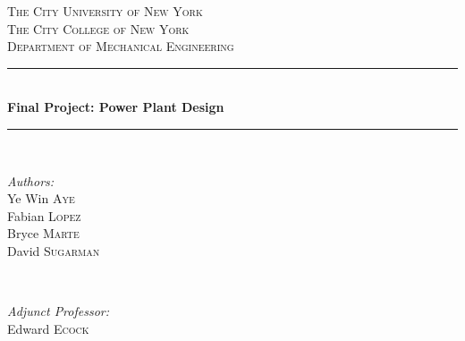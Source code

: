 \documentclass[12pt,letterpaper,notitlepage]{article}
\begin{document}
\begin{titlepage}

\newcommand{\HRule}{\rule{\linewidth}{0.5mm}} %

\center %


\textsc{\LARGE The City University of New York}\\[1.5cm] %
\textsc{\Large The City College of New York}\\[0.5cm] %
\textsc{\large Department of Mechanical Engineering}\\[0.5cm] %


\HRule \\[0.4cm]
{ \huge \bfseries Final Project: Power Plant Design}\\[0.4cm] %
\HRule \\[1.5cm]


\begin{minipage}{0.4\textwidth}
\begin{flushleft} \large
\emph{Authors:}\\
Ye Win \textsc{Aye}\\
Fabian \textsc{Lopez}\\
Bryce \textsc{Marte}\\
David \textsc{Sugarman} %
\end{flushleft}
\end{minipage}
~
\begin{minipage}{0.4\textwidth}
\begin{flushright} \large
\emph{Adjunct Professor:} \\
Edward \textsc{Ecock} %
\end{flushright}
\end{minipage}\\[4cm]


\end{titlepage}
\end{document}
